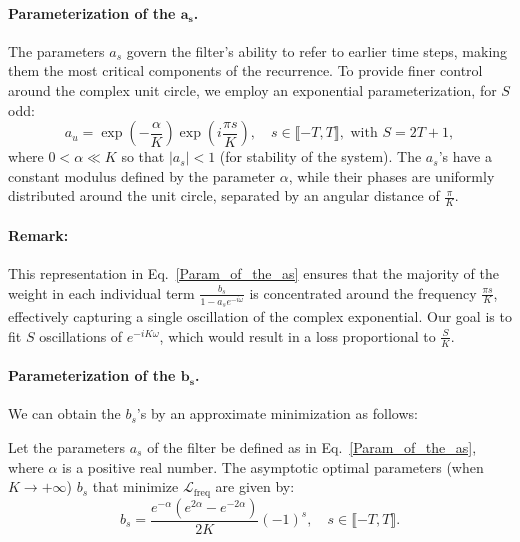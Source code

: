 \paragraph{Parameterization of the $\boldsymbol{a_s}$.} 
The parameters \(a_s\) govern the filter's ability to refer to earlier time steps, making them the most critical components of the recurrence. To provide finer control around  the complex unit circle, we employ an exponential parameterization, for $S$ odd:
\begin{equation}
    a_u = \exp\left(-\frac{\alpha}{K}\right)\exp\left(i\frac{\pi s}{K}\right), \quad s \in \llbracket -T, T\rrbracket, \text{ with } S = 2T+1,
    \label{Param_of_the_as}
\end{equation}
where \(0<\alpha\ll K\) so that $\vert a_s\vert<1$ (for stability of the system). The \(a_s\)'s have a constant modulus defined by the parameter \(\alpha\), while their phases are uniformly distributed around the unit circle, separated by an angular distance of \(\frac{\pi}{K}\).

\paragraph{Remark:} This representation in Eq.~\eqref{Param_of_the_as} ensures that the majority of the weight in each individual term \(\frac{b_s}{1-a_se^{-i\omega}}\) is concentrated around the frequency \(\frac{\pi s}{K}\), effectively capturing a single oscillation of the complex exponential. Our goal is to fit \(S\) oscillations of \(e^{-iK\omega}\), which would result in a loss proportional to \(\frac{S}{K}\).



\paragraph{Parameterization of the $\boldsymbol{b_s}$.} We can obtain the $b_s$'s by an approximate minimization as follows:
\begin{lemma}\label{Lemma param of bs}
    Let the parameters $a_s$ of the filter be defined as in Eq.~\eqref{Param_of_the_as}, where $\alpha$ is a positive real number. The asymptotic optimal parameters (when $K\rightarrow+\infty$) $b_s$ that minimize $\mathcal{L}_\text{freq}$ are given by: 
    \begin{equation}
        b_s = \frac{e^{-\alpha}(e^{2\alpha} - e^{-2\alpha})}{2K}(-1)^s, \quad s \in \llbracket -T, T\rrbracket.
        \label{Param_of_the_bs}
    \end{equation}
\end{lemma}

